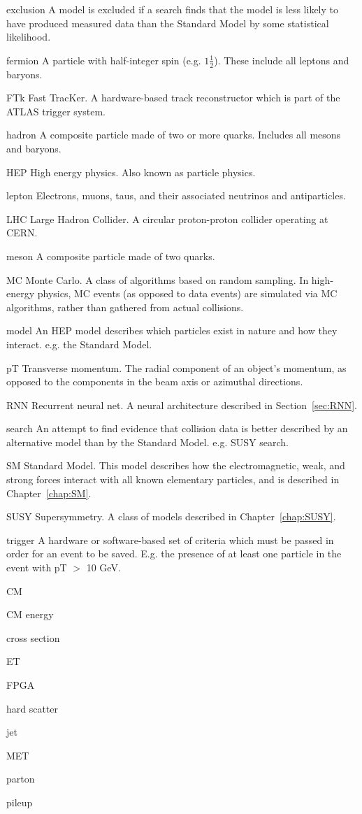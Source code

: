 \begin{symbollist*}
\item[exclusion] A model is excluded if a search finds that the model is less likely to have produced measured data than the Standard Model by some statistical likelihood.
\item[fermion] A particle with half-integer spin (e.g. $1\frac{1}{2}$). These include all leptons and baryons.
\item[FTk] Fast TracKer. A hardware-based track reconstructor which is part of the ATLAS trigger system.
\item[hadron] A composite particle made of two or more quarks. Includes all mesons and baryons.
\item[HEP] High energy physics. Also known as particle physics.
\item[lepton] Electrons, muons, taus, and their associated neutrinos and antiparticles.
\item[LHC] Large Hadron Collider. A circular proton-proton collider operating at CERN.
\item[meson] A composite particle made of two quarks.
\item[MC] Monte Carlo. A class of algorithms based on random sampling. In high-energy physics, MC events (as opposed to data events) are simulated via MC algorithms, rather than gathered from actual collisions.
\item[model] An HEP model describes which particles exist in nature and how they interact. e.g. the Standard Model.
\item[pT] Transverse momentum. The radial component of an object's momentum, as opposed to the components in the beam axis or azimuthal directions.
\item[RNN] Recurrent neural net. A neural architecture described in Section~\ref{sec:RNN}.
\item[search] An attempt to find evidence that collision data is better described by an alternative model than by the Standard Model. e.g. SUSY search.
\item[SM] Standard Model. This model describes how the electromagnetic, weak, and strong forces interact with all known elementary particles, and is described in Chapter~\ref{chap:SM}.
\item[SUSY] Supersymmetry. A class of models described in Chapter~\ref{chap:SUSY}.
\item[trigger] A hardware or software-based set of criteria which must be passed in order for an event to be saved. E.g. the presence of at least one particle in the event with pT $>$ 10 GeV.

\item[CM]
\item[CM energy]
\item[cross section]
\item[ET]
\item[FPGA]
\item[hard scatter]
\item[jet]
\item[MET]
\item[parton]
\item[pileup] \cite{pileup}

\end{symbollist*}